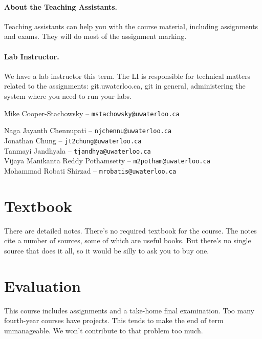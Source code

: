 \paragraph{About the Teaching Assistants.}

Teaching assistants can help you with the course material, including assignments and exams. They will do most of the assignment marking.

\paragraph{Lab Instructor.}
We have a lab instructor this term. The LI is responsible for technical matters related to the assignments: git.uwaterloo.ca, git in general, administering the system where you need to run your labs.

\noindent
\hspace*{2em} 
\begin{minipage}{.7\textwidth}
Mike Cooper-Stachowsky -- {\tt mstachowsky@uwaterloo.ca}
\end{minipage}


\hspace*{2em} \begin{minipage}{.7\textwidth}
Naga Jayanth Chennupati -- \texttt{njchennu@uwaterloo.ca} \\
Jonathan Chung -- \texttt{jt2chung@uwaterloo.ca} \\
Tanmayi Jandhyala -- \texttt{tjandhya@uwaterloo.ca} \\
Vijaya Manikanta Reddy Pothamsetty -- \texttt{m2potham@uwaterloo.ca} \\
Mohammad Robati Shirzad -- \texttt{mrobatis@uwaterloo.ca}
\end{minipage}

\section*{Textbook}
There are detailed notes. There's no required textbook for the course. The notes cite a number of sources, some of which are useful books. But there's no single source that does it all, so it would be silly to ask you to buy one.

\section*{Evaluation}
This course includes assignments and a take-home final
examination. Too many fourth-year courses have projects. This tends to make the end of term unmanageable. We won't contribute to that problem too much.\vspace*{1em}


